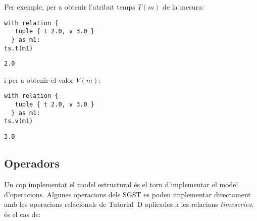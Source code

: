 Per exemple, per a obtenir l'atribut temps $T(m)$ de la mesura:
\begin{lstlisting}[style=tutorialD]
with relation {
   tuple { t 2.0, v 3.0 }
  } as m1: 
ts.t(m1)
\end{lstlisting}
\begin{lstlisting}[style=stdout]
2.0
\end{lstlisting}
i per a obtenir el valor $V(m)$:
\begin{lstlisting}[style=tutorialD]
with relation {
   tuple { t 2.0, v 3.0 }
  } as m1: 
ts.v(m1)
\end{lstlisting}
\begin{lstlisting}[style=stdout]
3.0
\end{lstlisting}



\subsection{Operadors}

Un cop implementat el model estructural és el torn d'implementar el
model d'operacions.  Algunes operacions dels \gls{SGST} es poden
implementar directament amb les operacions relacionals de Tutorial~D
aplicades a les relacions \emph{timeseries}, és el cas de:

